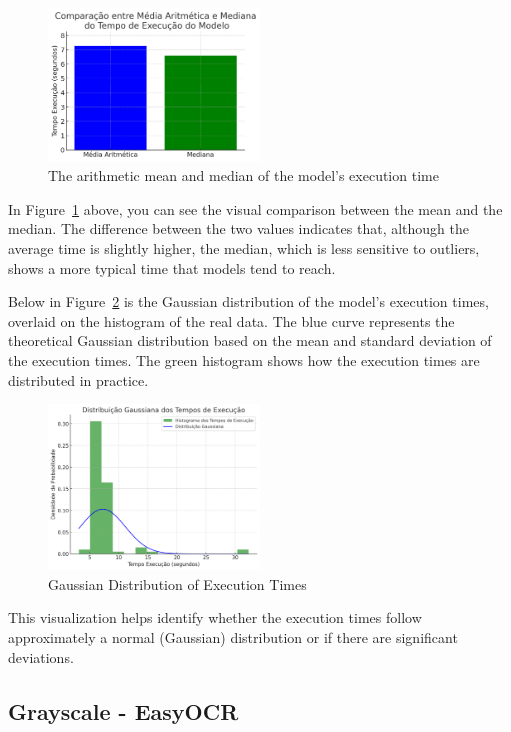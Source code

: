 \documentclass[conference]{IEEEtran}
\begin{document}
	\begin{figure}[htbp]
		\centerline{\includegraphics[width=0.5\textwidth]{img5.png}}
		\caption{The arithmetic mean and median of the model's execution time}
		\label{img5}
	\end{figure}
	
	In Figure~\ref{img5} above, you can see the visual comparison between the mean and the median. The difference between the two values indicates that, although the average time is slightly higher, the median, which is less sensitive to outliers, shows a more typical time that models tend to reach.
	
	Below in Figure~\ref{img6} is the Gaussian distribution of the model's execution times, overlaid on the histogram of the real data. The blue curve represents the theoretical Gaussian distribution based on the mean and standard deviation of the execution times. The green histogram shows how the execution times are distributed in practice.
	
	\begin{figure}[htbp]
		\centerline{\includegraphics[width=0.5\textwidth]{img6.png}}
		\caption{Gaussian Distribution of Execution Times}
		\label{img6}
	\end{figure}
	
	This visualization helps identify whether the execution times follow approximately a normal (Gaussian) distribution or if there are significant deviations.
	
	\subsection{Grayscale - EasyOCR}
	
\end{document}
